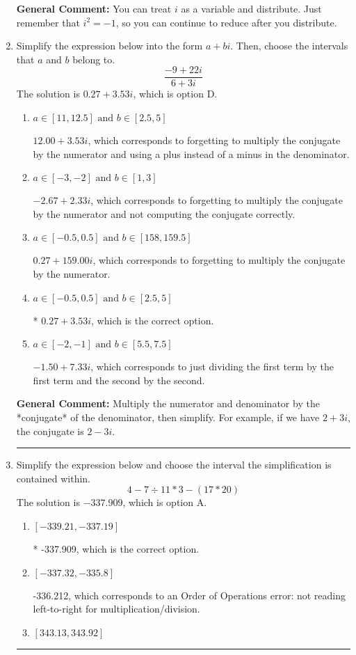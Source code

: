 \documentclass{extbook}[14pt]
\newcommand{\litem}[1]{\item #1

\rule{\textwidth}{0.4pt}}
\begin{document}
\begin{enumerate}
{\textbf{General Comment:} You can treat $i$ as a variable and distribute. Just remember that $i^2=-1$, so you can continue to reduce after you distribute.
}
\litem{
Simplify the expression below into the form $a+bi$. Then, choose the intervals that $a$ and $b$ belong to.
\[ \frac{-9 + 22 i}{6 + 3 i} \]The solution is \( 0.27  + 3.53 i \), which is option D.\begin{enumerate}[label=\Alph*.]
\item \( a \in [11, 12.5] \text{ and } b \in [2.5, 5] \)

 $12.00  + 3.53 i$, which corresponds to forgetting to multiply the conjugate by the numerator and using a plus instead of a minus in the denominator.
\item \( a \in [-3, -2] \text{ and } b \in [1, 3] \)

 $-2.67  + 2.33 i$, which corresponds to forgetting to multiply the conjugate by the numerator and not computing the conjugate correctly.
\item \( a \in [-0.5, 0.5] \text{ and } b \in [158, 159.5] \)

 $0.27  + 159.00 i$, which corresponds to forgetting to multiply the conjugate by the numerator.
\item \( a \in [-0.5, 0.5] \text{ and } b \in [2.5, 5] \)

* $0.27  + 3.53 i$, which is the correct option.
\item \( a \in [-2, -1] \text{ and } b \in [5.5, 7.5] \)

 $-1.50  + 7.33 i$, which corresponds to just dividing the first term by the first term and the second by the second.
\end{enumerate}

\textbf{General Comment:} Multiply the numerator and denominator by the *conjugate* of the denominator, then simplify. For example, if we have $2+3i$, the conjugate is $2-3i$.
}
\litem{
Simplify the expression below and choose the interval the simplification is contained within.
\[ 4 - 7 \div 11 * 3 - (17 * 20) \]The solution is \( -337.909 \), which is option A.\begin{enumerate}[label=\Alph*.]
\item \( [-339.21, -337.19] \)

* -337.909, which is the correct option.
\item \( [-337.32, -335.8] \)

 -336.212, which corresponds to an Order of Operations error: not reading left-to-right for multiplication/division.
\item \( [343.13, 343.92] \)


\end{enumerate}}
\end{enumerate}
\end{document}
